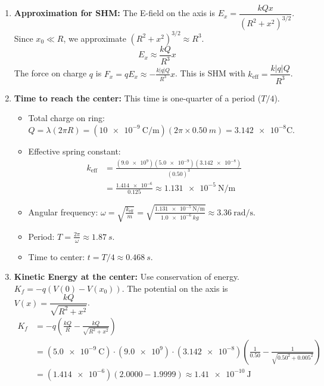 \documentclass{article}
\numberwithin{equation}{section}
\begin{document}
\begin{enumerate}
    \item \textbf{Approximation for SHM:} The E-field on the axis is $E_x = \dfrac{kQx}{(R^2+x^2)^{3/2}}$.
    Since $x_0 \ll R$, we approximate $(R^2+x^2)^{3/2} \approx R^3$.
    $$ E_x \approx \frac{kQ}{R^3}x $$
    The force on charge $q$ is $F_x = qE_x \approx -\frac{k|q|Q}{R^3}x$. This is SHM with $k_{\text{eff}} = \dfrac{k|q|Q}{R^3}$.
    
    \item[(a)] \textbf{Time to reach the center:} This time is one-quarter of a period ($T/4$).
    \begin{itemize}
        \item Total charge on ring: $Q = \lambda(2\pi R) = (\SI{10e-9}{\coulomb\per\meter})(2\pi \times \SI{0.50}{m}) = \num{3.142e-8} \si{\coulomb}$.
        \item Effective spring constant:
        \begin{align*}
            k_{\text{eff}} &= \frac{(\num{9.0e9})(\num{5.0e-9})(\num{3.142e-8})}{(\num{0.50})^3} \\
            &= \frac{\num{1.414e-6}}{0.125} \approx \SI{1.131e-5}{\newton\per\meter}
        \end{align*}
        \item Angular frequency: $\omega = \sqrt{\frac{k_{\text{eff}}}{m}} = \sqrt{\frac{\SI{1.131e-5}{\newton\per\meter}}{\SI{1.0e-6}{kg}}} \approx \SI{3.36}{\radian\per\second}$.
        \item Period: $T = \frac{2\pi}{\omega} \approx \SI{1.87}{s}$.
        \item Time to center: $t = T/4 \approx \SI{0.468}{s}$.
    \end{itemize}

    \item[(b)] \textbf{Kinetic Energy at the center:} Use conservation of energy. $K_f = -q(V(0) - V(x_0))$.
    The potential on the axis is $V(x) = \dfrac{kQ}{\sqrt{R^2+x^2}}$.
    \begin{align*}
        K_f &= -q \left( \frac{kQ}{R} - \frac{kQ}{\sqrt{R^2+x^2}} \right) \\
        &= (\SI{5.0e-9}{\coulomb}) \cdot (\num{9.0e9}) \cdot (\num{3.142e-8}) \left( \frac{1}{0.50} - \frac{1}{\sqrt{0.50^2 + 0.005^2}} \right) \\
        &= (\num{1.414e-6}) \left( 2.0000 - 1.9999 \right) \approx \SI{1.41e-10}{\joule}
    \end{align*}
\end{enumerate}
\end{document}
